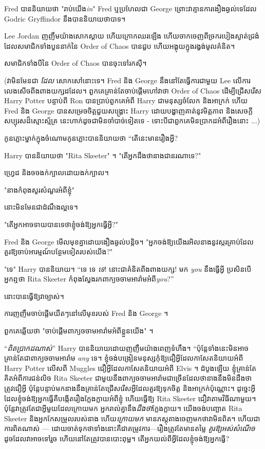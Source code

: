 {Fred បាននិយាយថា "រាប់យើង\emph{in}" Fred ឬប្រហែលជា George ព្រោះវាគ្មានការងឿងឆ្ងល់ទេដែល Godric Gryffindor នឹងបាននិយាយថាបាទ។

Lee Jordan ញញឹមយ៉ាងសោកស្ដាយ ហើយក្រោកឈរឡើង ហើយចាកចេញពីច្រករបៀងស្ងាត់ជ្រងំ ដែលសមាជិកទាំងបួននាក់នៃ Order of Chaos បានជួប ហើយអង្គុយក្នុងរង្វង់មូលគំនិត។

សមាជិកទាំងបីនៃ Order of Chaos បានចុះទៅរកស៊ី។

(វាមិនមែនជា \emph{ដែល} សោកសៅនោះទេ។ Fred និង George នឹងនៅតែធ្វើការជាមួយ Lee លើការលេងសើចពីងពាងយក្សដដែល។ ពួកគេគ្រាន់តែចាប់ផ្តើមហៅវាថា Order of Chaos ដើម្បីជ្រើសរើស Harry Potter បន្ទាប់ពី Ron បានប្រាប់ពួកគេអំពី Harry ជាមនុស្សចំលែក និងអាក្រក់ ហើយ Fred និង George បានសម្រេចចិត្តជួយសង្គ្រោះ Harry ដោយបង្ហាញគាត់នូវមិត្តភាព និងសេចក្តីសប្បុរសដ៏ស្មោះស្ម័គ្រ នេះហាក់ដូចជាមិនចាំបាច់ទៀតទេ - ទោះបីជាពួកគេមិនប្រាកដអំពីរឿងនោះ \emph...)

កូនភ្លោះ​ម្នាក់​ក្នុង​ចំណោម​កូន​ភ្លោះ​បាន​និយាយ​ថា “តើ​នេះ​មាន​រឿង​អ្វី?

Harry បាននិយាយថា "Rita Skeeter" ។ "តើអ្នកដឹងថានាងជានរណាទេ?"

ហ្វ្រេដ និងចចងក់ក្បាលដោយងក់ក្បាល។

"នាងកំពុងសួរសំណួរអំពីខ្ញុំ"

នោះ​មិន​មែន​ជា​ដំណឹង​ល្អ​ទេ។

"តើអ្នកអាចទាយបានទេថាខ្ញុំចង់ឱ្យអ្នកធ្វើអ្វី?"

Fred និង George មើលមុខគ្នាដោយងឿងឆ្ងល់បន្តិច។ "អ្នកចង់ឱ្យយើងរអិលនាងនូវស្ករគ្រាប់ដែលគួរឱ្យចាប់អារម្មណ៍បន្ថែមទៀតរបស់យើង?"

"ទេ" Harry បាននិយាយ។ “ទេ ទេ \emph{ទេ}! នោះ​ជា​គំនិត​ពីងពាង​យក្ស! មក \emph{you} នឹងធ្វើអ្វី ប្រសិនបើអ្នកឮថា Rita Skeeter កំពុងស្វែងរកពាក្យចចាមអារ៉ាមអំពី\emph{you}?”

នោះបានធ្វើឱ្យវាច្បាស់។

ការញញឹមចាប់ផ្តើមយឺតៗនៅលើមុខរបស់ Fred និង George ។

ពួកគេឆ្លើយថា "ចាប់ផ្តើមពាក្យចចាមអារ៉ាមអំពីខ្លួនយើង" ។

“\emph{ពិតប្រាកដណាស់}” Harry បាននិយាយដោយញញឹមយ៉ាងពេញទំហឹង។ “ប៉ុន្តែទាំងនេះមិនអាចគ្រាន់តែជាពាក្យចចាមអារ៉ាម \emph{any} ទេ។ ខ្ញុំចង់បង្រៀនមនុស្សកុំឱ្យជឿអ្វីដែលកាសែតនិយាយអំពី Harry Potter លើសពី Muggles ជឿអ្វីដែលកាសែតនិយាយអំពី Elvis ។ ដំបូងឡើយ ខ្ញុំគ្រាន់តែគិតអំពីការជន់លិច Rita Skeeter ជាមួយនឹងពាក្យចចាមអារ៉ាមជាច្រើនដែលថានាងនឹងមិនដឹងថាត្រូវជឿអ្វី ប៉ុន្តែបន្ទាប់មកនាងនឹងគ្រាន់តែជ្រើសរើសអ្វីដែលគួរឱ្យទុកចិត្ត និងអាក្រក់ប៉ុណ្ណោះ។ ដូច្នេះ​អ្វី​ដែល​ខ្ញុំ​ចង់​ឱ្យ​អ្នក​ធ្វើ​គឺ​បង្កើត​រឿង​ក្លែងក្លាយ​អំពី​ខ្ញុំ ហើយ​ធ្វើ​ឱ្យ Rita Skeeter ជឿ​វា​តាម​វិធី​ណា​មួយ​។ ប៉ុន្តែវាត្រូវតែជាអ្វីមួយដែលក្រោយមក អ្នករាល់គ្នានឹង\emph{ដឹងថា}ក្លែងក្លាយ។ យើងចង់បញ្ឆោត Rita Skeeter និងអ្នកកែសម្រួលរបស់នាង ហើយ\emph{ក្រោយមក} មានភស្តុតាងចេញមកថាវាមិនពិត។ ហើយជាការពិតណាស់ — ដោយចាត់ទុកថាទាំងនោះគឺជាតម្រូវការ—រឿងត្រូវតែមានតម្លៃ \emph{គួរឱ្យអស់សំណើច} ដូចដែលវាអាចទៅរួច ហើយនៅតែត្រូវបានបោះពុម្ព។ តើអ្នកយល់ពីអ្វីដែលខ្ញុំចង់ឱ្យអ្នកធ្វើ?

}
